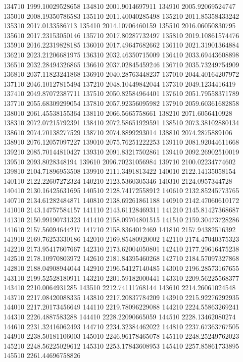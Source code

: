 {134710 1999.10029528658
134810 2001.9014697911
134910 2005.92069524747
135010 2008.19350786583
135110 2011.40040285498
135210 2011.85358433242
135310 2017.0133586713
135410 2014.10706460159
135510 2016.06050830795
135610 2017.23153050146
135710 2017.80287732497
135810 2019.10861574476
135910 2016.22319828185
136010 2017.49647682662
136110 2021.31901364884
136210 2023.21206681975
136310 2032.46350715009
136410 2033.69443608898
136510 2032.28494326865
136610 2037.02845459246
136710 2035.73249754909
136810 2037.11823241868
136910 2040.28763448237
137010 2044.40164207972
137110 2046.10127815494
137210 2048.10449842044
137310 2049.1234416419
137410 2049.87072387711
137510 2050.82584964401
137610 2051.79558371789
137710 2055.68309299054
137810 2057.92356095982
137910 2059.60361682858
138010 2061.45538155364
138110 2066.5665758661
138210 2071.6056410928
138310 2072.07215792391
138410 2072.58651929591
138510 2073.38102880134
138610 2074.70138277529
138710 2074.8899293014
138810 2074.2875889106
138910 2076.12057097227
139010 2075.76251222253
139110 2081.92044611668
139210 2085.70144810427
139310 2091.83217502861
139410 2092.26902510019
139510 2093.8028348194
139610 2096.70231056984
139710 2100.02234774602
139810 2104.71896953508
139910 2111.3491813422
140010 2122.14135058154
140110 2122.22607272324
140210 2123.5360305346
140310 2124.0957344728
140410 2130.16425631695
140510 2128.74172558912
140610 2132.85245773765
140710 2134.61282484871
140810 2138.69261861188
140910 2142.47060610172
141010 2143.14757584157
141110 2143.61128469311
141210 2145.81427368687
141310 2150.99190731323
141410 2158.09704801515
141510 2159.30473728286
141610 2157.56094644217
141710 2158.8364012469
141810 2157.94382516392
141910 2169.76253330186
142010 2169.85480920002
142110 2174.47040375323
142210 2173.95417607667
142310 2173.62004050801
142410 2177.29616475238
142510 2178.10970803972
142610 2181.84395460268
142710 2184.57097327868
142810 2188.04908944044
142910 2196.54127140485
143010 2196.28573167655
143110 2199.52528180911
143210 2201.59182000441
143310 2209.56225568377
143410 2210.0064931285
143510 2212.74111768144
143610 2214.26061024548
143710 2217.08420088335
143810 2217.20837784209
143910 2215.92276292935
144010 2217.20173456649
144110 2219.78096229088
144210 2224.55863269241
144310 2226.4887583288
144410 2228.22090665059
144510 2228.13462080274
144610 2231.32416062493
144710 2234.32384462022
144810 2237.67363767505
144910 2238.50181106003
145010 2246.96178465078
145110 2248.25249762023
145210 2248.56225029612
145310 2253.17843608953
145410 2257.85861733895
145510 2261.44696758826
}
